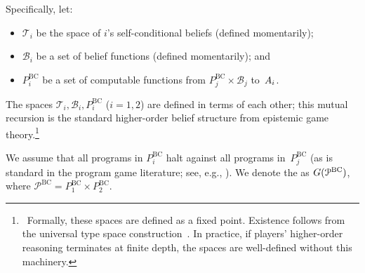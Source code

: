 \documentclass[sigconf]{aamas}
\theoremstyle{definition}
\newcommand{\bcprogspacei}{P^{\mathrm{BC}}_i}
\newcommand{\bcprogspacej}{P^{\mathrm{BC}}_j}
\newcommand{\bcprogspaceone}{P^{\mathrm{BC}}_1}
\newcommand{\bcprogspacetwo}{P^{\mathrm{BC}}_2}
\newcommand{\allbcprog}{\mathcal{P}^{\mathrm{BC}}}
\newcommand{\beliefspacei}{\mathcal{B}_i}       %
\newcommand{\beliefspacej}{\mathcal{B}_j}       %
\newcommand{\scbspacei}{\mathcal{T}_i}          %
\begin{document}
Specifically, let:
\begin{itemize}
    \item $\scbspacei$ be the space of $i$'s self-conditional beliefs (defined momentarily);
    \item $\beliefspacei$ be a set of belief functions
    (defined momentarily); and
    \item $\bcprogspacei$ be a set of computable functions from $\bcprogspacej \times \beliefspacej$ to~$A_i$.
\end{itemize}
The spaces $\scbspacei, \beliefspacei, \bcprogspacei$ ($i = 1,2$) are defined in terms of each other; this mutual recursion is the standard higher-order belief structure from epistemic game theory.\footnote{ \ Formally, these spaces are defined as a fixed point. Existence follows from the universal type space construction~\citep{mertens1985formulation, brandenburger1993hierarchies}. In practice, if players' higher-order reasoning terminates at finite depth, the spaces are well-defined without this machinery.}

We assume that all programs in $\bcprogspacei$ halt against all programs in~$\bcprogspacej$ (as is standard in the program game literature; see, e.g., \citet{tennenholtz2004program, oesterheld2019robust}).
We denote the  as $\game(\allbcprog)$, where $\allbcprog = \bcprogspaceone \times \bcprogspacetwo$.
\end{document}
